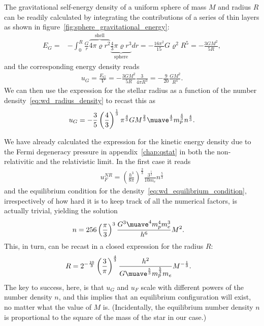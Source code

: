 The gravitational self-energy density of a uniform sphere of mass $M$ and radius
$R$ can be readily calculated by integrating the contributions of a series of
thin layers as shown in figure~\ref{fig:sphere_gravitational_energy}:
\begin{align*}
  E_G = &- \int_0^R \frac{G}{r}
    \overbrace{4\pi \varrho r^2}^\text{shell}
    \underbrace{\frac{4}{3} \pi \varrho r^3}_\text{sphere} dr =
   - \frac{16 \pi^2}{15} G \varrho^2 R^5 = -\frac{3GM^2}{5R},
\end{align*}
and the corresponding energy density reads
\begin{align*}
  u_G = \frac{E_G}{V} =
  -\frac{3GM^2}{5R} \frac{3}{4\pi R^3} = -\frac{9}{20} \frac{GM^2}{R^4}.
\end{align*}
We can then use the expression for the stellar radius as a function of the number
density~\eqref{eq:wd_radius_density} to recast this as
\begin{align}
	u_G = -\frac{3}{5} \left( \frac{4}{3} \right)^\frac{1}{3} \pi^\frac{4}{3} G M^\frac{2}{3}
	\muave^\frac{4}{3} m_p^\frac{4}{3} n^\frac{4}{3}.
\end{align}

We have already calculated the expression for the kinetic energy density due to the
Fermi degeneracy pressure in appendix~\ref{chap:qstat} in both the non-relativitic
and the relativistic limit. In the first case it reads
\begin{align}
  u_F^{NR} = \left( \frac{h^3}{8\pi} \right)^\frac{2}{3}
	\frac{3^\frac{5}{3}}{10 m_e} n^\frac{5}{3}
\end{align}
and the equilibrium condition for the density~\eqref{eq:wd_equilibrium_condition},
irrespectively of how hard it is to keep track of all the numerical factors, is actually
trivial, yielding the solution
\begin{align}\label{eq:wd_n_nr}
  n &= 256 \left( \frac{\pi}{3} \right)^3 \frac{G^3 \muave^4 m_p^4 m_e^3}{h^6} M^2.
\end{align}
This, in turn, can be recast in a closed expression for the radius $R$:
\begin{align}\label{eq:wd_radius_nr}
  R &= 2^{-\frac{10}{3}} \left( \frac{3}{\pi} \right)^\frac{4}{3}
  \frac{h^2}{G \muave^\frac{5}{3} m_p^\frac{5}{3} m_e} M^{-\frac{1}{3}}.
\end{align}
The key to success, here, is that $u_G$ and $u_F$ scale with different powers of the
number density $n$, and this implies that an equilibrium configuration will exist,
no matter what the value of $M$ is. (Incidentally, the equilibrium number density
$n$ is proportional to the square of the mass of the star in our case.)

